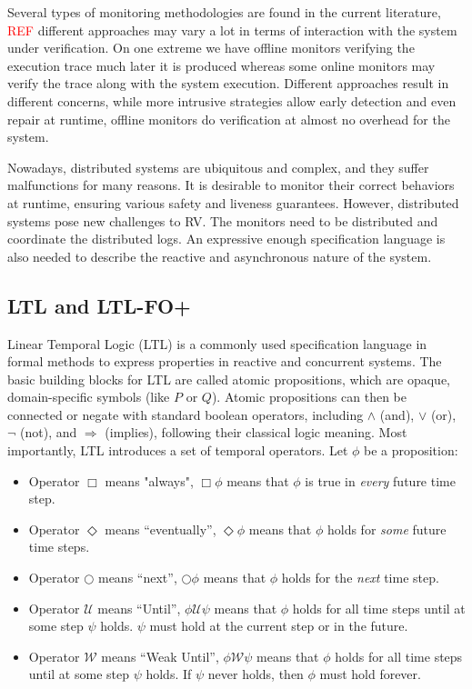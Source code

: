 \documentclass[format=acmsmall, nonacm=true, review=true, screen=true]{acmart}
\newcommand{\red}[1]{\textcolor{red}{#1}}
\begin{document}
Several types of monitoring methodologies are found in the current literature, \red{REF} different approaches may vary a lot in terms of interaction with the system under verification. On one extreme we have offline monitors verifying the execution trace much later it is produced whereas some online monitors may verify the trace along with the system execution. Different approaches result in different concerns, while more intrusive strategies allow early detection and even repair at runtime, offline monitors do verification at almost no overhead for the system.

Nowadays, distributed systems are ubiquitous and complex, and they suffer malfunctions for many reasons. It is desirable to monitor their correct behaviors at runtime, ensuring various safety and liveness guarantees. However, distributed systems pose new challenges to RV. The monitors need to be distributed and coordinate the distributed logs. An expressive enough specification language is also needed to describe the reactive and asynchronous nature of the system.

\subsection{LTL and LTL-FO+}
Linear Temporal Logic (LTL) is a commonly used specification language in formal methods to express properties in reactive and concurrent systems. The basic building blocks for LTL are called atomic propositions, which are opaque, domain-specific symbols (like $P$ or $Q$). Atomic propositions can then be connected or negate with standard boolean operators, including $\land$ (and), $\lor$ (or), $\lnot$ (not), and $\Rightarrow$ (implies), following their classical logic meaning. Most importantly, LTL introduces a set of temporal operators. Let $\phi$ be a proposition:
\begin{itemize}
  \item Operator $\Box$ means "always", $\Box \phi$ means that $\phi$ is true in \textit{every} future time step.
  \item Operator $\Diamond$ means “eventually”, $\Diamond \phi$ means that $\phi$ holds for \textit{some} future time steps.
  \item Operator $\bigcirc$ means “next”, $\bigcirc \phi$ means that $\phi$ holds for the \textit{next} time step.
  \item Operator $\mathcal{U}$ means “Until”, $\phi \mathcal{U}\psi$ means that $\phi$ holds for all time steps until at some step $\psi$ holds. $\psi$ must hold at the current step or in the future.
  \item Operator $\mathcal{W}$ means “Weak Until”, $\phi \mathcal{W}\psi$ means that $\phi$ holds for all time steps until at some step $\psi$ holds. If $\psi$ never holds, then $\phi$ must hold forever.
\end{itemize}
\end{document}
